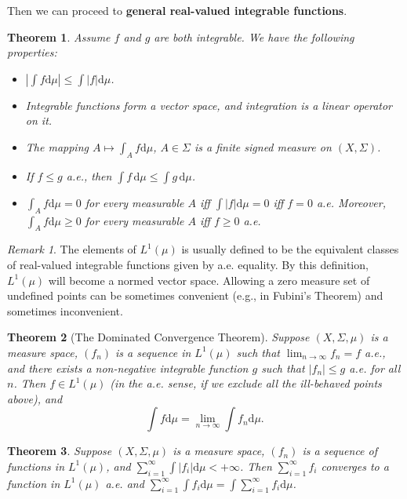 \documentclass[openany]{book}
\newtheorem{theorem}{Theorem}[chapter]
\theoremstyle{definition}
\theoremstyle{remark}
\newtheorem*{remark}{Remark}
\begin{document}
Then we can proceed to \textbf{general real-valued integrable functions}.
\begin{theorem}
    Assume $f$ and $g$ are both integrable. We have the following properties:
    \begin{itemize}
        \item $\left|\int f\mathrm{d}\mu\right|\le\int|f|\mathrm{d}\mu$.
        \item Integrable functions form a vector space, and integration is a linear operator on it.
        \item The mapping $A\mapsto\int_Af \mathrm{d}\mu$, $A\in\Sigma$ is a finite signed measure on $(X,\Sigma)$.
        \item If $f\le g$ a.e., then $\int f\,\mathrm{d}\mu\le\int g\,\mathrm{d}\mu$.
        \item $\int_A f \mathrm{d}\mu=0$ for every measurable $A$ iff $\int|f|\mathrm{d}\mu=0$ iff $f=0$ a.e. Moreover, $\int_A f \mathrm{d}\mu\ge0$ for every measurable $A$ iff $f\ge0$ a.e.
    \end{itemize}
\end{theorem}
\begin{remark}
    The elements of $L^1(\mu)$ is usually defined to be the equivalent classes of real-valued integrable functions given by a.e. equality. By this definition, $L^1(\mu)$ will become a normed vector space. Allowing a zero measure set of undefined points can be sometimes convenient (e.g., in Fubini's Theorem) and sometimes inconvenient.
\end{remark}
\begin{theorem}[The Dominated Convergence Theorem]
    Suppose $(X,\Sigma,\mu)$ is a measure space, $(f_n)$ is a sequence in $L^1(\mu)$ such that $\lim_{n\to\infty}f_n=f$ a.e., and there exists a non-negative integrable function $g$ such that $|f_n|\le g$ a.e. for all $n$. Then $f\in L^1(\mu)$ (in the a.e. sense, if we exclude all the ill-behaved points above), and
    \begin{equation*}
        \int f \mathrm{d}\mu=\lim_{n\to\infty}\int f_n \mathrm{d}\mu.
    \end{equation*}
\end{theorem}
\begin{theorem}\label{thm:L1Banach}
    Suppose $(X,\Sigma,\mu)$ is a measure space, $(f_n)$ is a sequence of functions in $L^1(\mu)$, and $\sum_{i=1}^{\infty}\int|f_i|\mathrm{d}\mu<+\infty$. Then $\sum_{i=1}^{\infty}f_i$ converges to a function in $L^1(\mu)$ a.e. and $\sum_{i=1}^{\infty}\int f_i \mathrm{d}\mu=\int \sum_{i=1}^{\infty}f_i \mathrm{d}\mu$.
\end{theorem}
\end{document}

